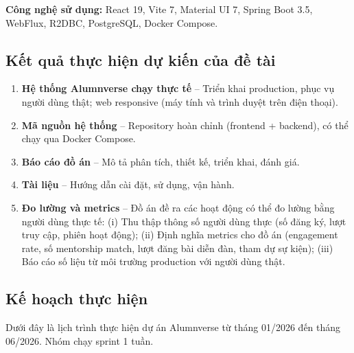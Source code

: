 \documentclass[12pt,a4paper]{article}
\begin{document}
\textbf{Công nghệ sử dụng:} React 19, Vite 7, Material UI 7, Spring Boot 3.5, WebFlux, R2DBC, PostgreSQL, Docker Compose.


\subsection{Kết quả thực hiện dự kiến của đề tài}

\begin{enumerate}
    \item \textbf{Hệ thống Alumnverse chạy thực tế} -- Triển khai production, phục vụ người dùng thật; web responsive (máy tính và trình duyệt trên điện thoại).
    \item \textbf{Mã nguồn hệ thống} -- Repository hoàn chỉnh (frontend + backend), có thể chạy qua Docker Compose.
    \item \textbf{Báo cáo đồ án} -- Mô tả phân tích, thiết kế, triển khai, đánh giá.
    \item \textbf{Tài liệu} -- Hướng dẫn cài đặt, sử dụng, vận hành.
    \item \textbf{Đo lường và metrics} -- Đồ án đề ra các hoạt động có thể đo lường bằng người dùng thực tế: (i) Thu thập thông số người dùng thực (số đăng ký, lượt truy cập, phiên hoạt động); (ii) Định nghĩa metrics cho đồ án (engagement rate, số mentorship match, lượt đăng bài diễn đàn, tham dự sự kiện); (iii) Báo cáo số liệu từ môi trường production với người dùng thật.
\end{enumerate}

\subsection{Kế hoạch thực hiện}

Dưới đây là lịch trình thực hiện dự án Alumnverse từ tháng 01/2026 đến tháng 06/2026. Nhóm chạy sprint 1 tuần.

\renewcommand{\arraystretch}{1.2}
\end{document}
